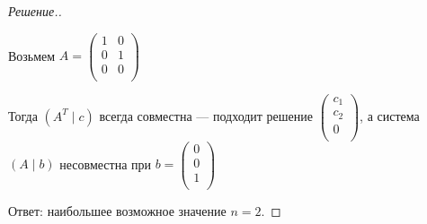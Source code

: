 \documentclass[a4paper]{article}
\theoremstyle{remark}
\begin{document}
\begin{proof}[Решение.]
\begin{itemize}
                Возьмем $A = 
                \begin{pmatrix}
                    1 & 0 \\ 
                    0 & 1  \\ 
                    0 & 0 \\ 
                \end{pmatrix} $
                
                Тогда $(A^T \mid c)$ всегда совместна --- подходит решение 
                $\begin{pmatrix}
                    c_1 \\ 
                    c_2 \\ 
                    0 \\ 
                \end{pmatrix}$, а система $(A \mid b)$ несовместна при $b = 
                \begin{pmatrix}
                    0 \\ 
                    0 \\ 
                    1 \\ 
                \end{pmatrix}$
            \end{itemize}

            Ответ: наибольшее возможное значение $n = 2$.
        \end{proof}	 
    
\end{document}
